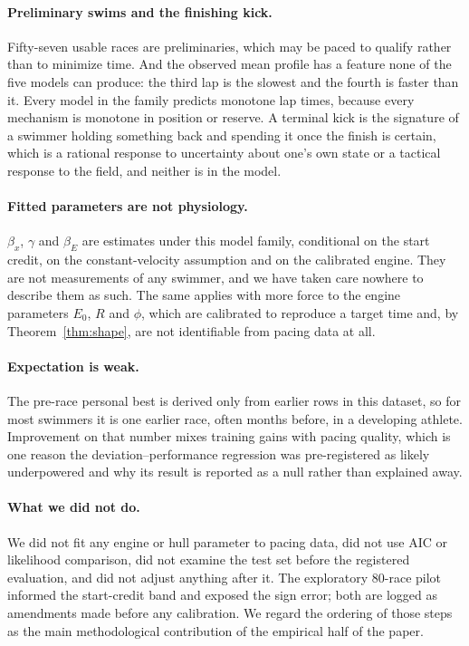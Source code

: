 \paragraph{Preliminary swims and the finishing kick.} Fifty-seven usable
races are preliminaries, which may be paced to qualify rather than to
minimize time. And the observed mean profile has a feature none of the five
models can produce: the third lap is the slowest and the fourth is faster
than it. Every model in the family predicts monotone lap times, because
every mechanism is monotone in position or reserve. A terminal kick is the
signature of a swimmer holding something back and spending it once the
finish is certain, which is a rational response to uncertainty about one's
own state or a tactical response to the field, and neither is in the model.

\paragraph{Fitted parameters are not physiology.} $\beta_x$, $\gamma$ and
$\beta_E$ are estimates under this model family, conditional on the start
credit, on the constant-velocity assumption and on the calibrated engine.
They are not measurements of any swimmer, and we have taken care nowhere to
describe them as such. The same applies with more force to the engine
parameters $E_0$, $R$ and $\phi$, which are calibrated to reproduce a target
time and, by Theorem~\ref{thm:shape}, are not identifiable from pacing data
at all.

\paragraph{Expectation is weak.} The pre-race personal best is derived only
from earlier rows in this dataset, so for most swimmers it is one earlier
race, often months before, in a developing athlete. Improvement on that
number mixes training gains with pacing quality, which is one reason the
deviation--performance regression was pre-registered as likely underpowered
and why its result is reported as a null rather than explained away.

\paragraph{What we did not do.} We did not fit any engine or hull parameter
to pacing data, did not use AIC or likelihood comparison, did not examine
the test set before the registered evaluation, and did not adjust anything
after it. The exploratory 80-race pilot informed the start-credit band and
exposed the sign error; both are logged as amendments made before any
calibration. We regard the ordering of those steps as the main
methodological contribution of the empirical half of the paper.
